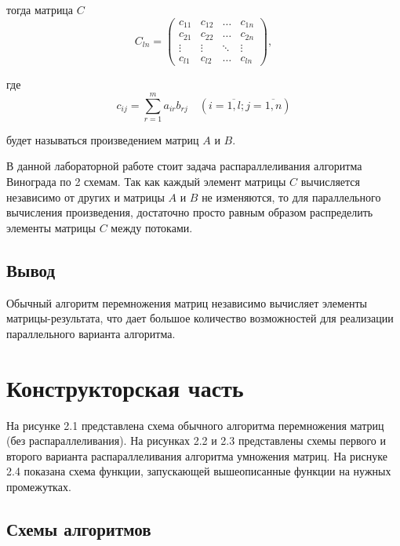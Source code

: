 \documentclass[12pt]{report}
\begin{document}
тогда матрица $C$
\begin{equation}
C_{ln} = \begin{pmatrix}
c_{11} & c_{12} & \ldots & c_{1n}\\
c_{21} & c_{22} & \ldots & c_{2n}\\
\vdots & \vdots & \ddots & \vdots\\
c_{l1} & c_{l2} & \ldots & c_{ln}
\end{pmatrix},
\end{equation}

где
\begin{equation}
\label{eq:M}
c_{ij} =
\sum_{r=1}^{m} a_{ir}b_{rj} \quad (i=\overline{1,l}; j=\overline{1,n})
\end{equation}

будет называться произведением матриц $A$ и $B$.


В данной лабораторной работе стоит задача распараллеливания алгоритма Винограда по 2 схемам. Так как каждый элемент матрицы $C$ вычисляется независимо от других и матрицы $A$ и $B$ не изменяются, то для параллельного вычисления произведения, достаточно просто равным образом распределить элементы матрицы $C$ между потоками.



\section{Вывод}
	Обычный алгоритм перемножения матриц независимо вычисляет элементы матрицы-результата, что дает большое количество возможностей для реализации параллельного варианта алгоритма.
\clearpage

\chapter{Конструкторская часть}

На рисунке 2.1 представлена схема обычного алгоритма перемножения матриц (без распараллеливания). На рисунках 2.2 и 2.3 представлены схемы первого и второго варианта распараллеливания алгоритма умножения матриц. На риснуке 2.4 показана схема функции, запускающей вышеописанные функции на нужных промежутках.

\section{Схемы алгоритмов}
\end{document}
